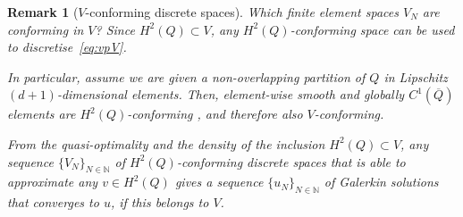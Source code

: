 \documentclass[a4paper]{article}
\theoremstyle{plain}
\newtheorem{remark}[theorem]{Remark}
\theoremstyle{definition}
\newcommand{\N}{\mathbb{N}}
\begin{document}
\begin{remark}[$V$-conforming discrete spaces]
Which finite element spaces $V_N$ are conforming in $V$?
Since $H^2(Q)\subset V$, any $H^2(Q)$-conforming space can be used to discretise~\eqref{eq:vpV}.

In particular, assume we are given a non-overlapping partition of $Q$ in Lipschitz $(d+1)$-dimensional elements.
Then, element-wise smooth and globally $C^1(\overline Q)$ elements are $H^2(Q)$-conforming \cite[Thm.~II.5.2]{Braess2007}, and therefore also $V$-conforming.

From the quasi-optimality and the density of the inclusion $H^2(Q)\subset V$, any sequence $\{V_N\}_{N\in\N}$ of $H^2(Q)$-conforming discrete spaces that is able to approximate any $v\in H^2(Q)$ gives a sequence $\{u_N\}_{N\in\N}$ of Galerkin solutions that converges to $u$, if this belongs to $V$.
\end{remark}
\end{document}
